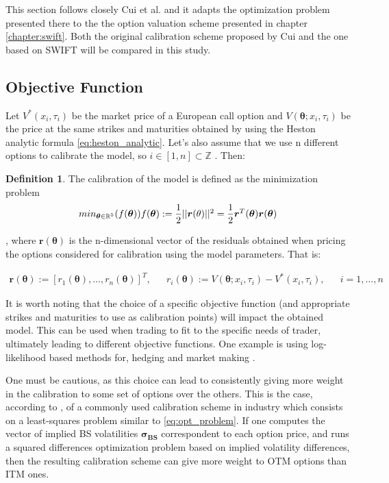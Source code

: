 \documentclass[12,twoside]{mammeTFM}
\theoremstyle{definition}
\newtheorem{definition}[thm]{Definition}
\theoremstyle{remark}
\newcommand{\Z}{\ensuremath{\mathbb{Z}}}
\newcommand{\R}{\ensuremath{\mathbb{R}}}
\begin{document}
This section follows closely Cui et al. \cite{cui17} and it adapts the optimization problem presented there to the the option valuation scheme presented in chapter \ref{chapter:swift}. Both the original calibration scheme proposed by Cui and the one based on SWIFT will be compared in this study.

\subsection{Objective Function}
Let $V^*(x_i, \tau_i)$ be the market price of a European call option and
 $V(\boldsymbol{\theta}; x_i, \tau_i)$ be the price at the same strikes and maturities obtained by using the Heston analytic formula \ref{eq:heston_analytic}. Let's also assume that we use n different options to calibrate the model, so 
 $i \in [1,n] \subset \Z$
 . Then:
\begin{definition} The calibration of the model is defined as the minimization problem 
\begin{equation} \label{eq:opt_problem}
min_{\boldsymbol{\theta} \in \R^5} (f(\boldsymbol{\theta}))$$ $$f(\boldsymbol{\theta}) := \dfrac{1}{2}||\boldsymbol{r}(\theta)||^2 = \dfrac{1}{2} \boldsymbol{r}^T(\boldsymbol{\theta})\boldsymbol{r}(\boldsymbol{\theta})
\end{equation}
\end{definition}

, where $\boldsymbol{r}(\boldsymbol{\theta})$ is the n-dimensional vector of the residuals obtained when pricing the options considered for calibration using the model parameters. That is:

\begin{align} \label{eq:opt_problem2}
\boldsymbol{r}(\boldsymbol{\theta}) := \left[r_1(\boldsymbol{\theta}), \ldots, r_n(\boldsymbol{\theta}) \right]^T, 
&& r_i(\boldsymbol{\theta}) :=  V(\boldsymbol{\theta}; x_i, \tau_i) - V^*(x_i, \tau_i), && i = 1, \ldots, n
\end{align}

It is worth noting that the choice of a specific objective function (and appropriate strikes and maturities to use as calibration points) will impact the obtained model. This can be used when trading to fit to the specific needs of trader, ultimately leading to different objective functions. One example is using log-likelihood based methods for, hedging and market making \cite{chr02}. 

One must be cautious, as this choice can lead to consistently giving more weight in the calibration to some set of options over the others. This is the case, according to \cite{cui17}, of a commonly used calibration scheme in industry which consists on a least-squares problem similar to \ref{eq:opt_problem}. If one computes the vector of implied BS volatilities $\boldsymbol{\sigma_{BS}}$ correspondent to each option price, and runs a squared differences optimization problem based on implied volatility differences, then the resulting calibration scheme can give more weight to OTM options than ITM ones.
\end{document}
